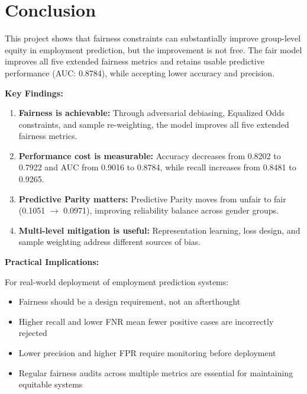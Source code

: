 \documentclass[11pt,a4paper]{article}
\begin{document}
\section{Conclusion}

This project shows that fairness constraints can substantially improve group-level equity in employment prediction, but the improvement is not free. The fair model improves all five extended fairness metrics and retains usable predictive performance (AUC: 0.8784), while accepting lower accuracy and precision.

\textbf{Key Findings:}

\begin{enumerate}
    \item \textbf{Fairness is achievable:} Through adversarial debiasing, Equalized Odds constraints, and sample re-weighting, the model improves all five extended fairness metrics.

    \item \textbf{Performance cost is measurable:} Accuracy decreases from 0.8202 to 0.7922 and AUC from 0.9016 to 0.8784, while recall increases from 0.8481 to 0.9265.

    \item \textbf{Predictive Parity matters:} Predictive Parity moves from unfair to fair (0.1051 $\rightarrow$ 0.0971), improving reliability balance across gender groups.

    \item \textbf{Multi-level mitigation is useful:} Representation learning, loss design, and sample weighting address different sources of bias.
\end{enumerate}

\textbf{Practical Implications:}

For real-world deployment of employment prediction systems:
\begin{itemize}
    \item Fairness should be a design requirement, not an afterthought
    \item Higher recall and lower FNR mean fewer positive cases are incorrectly rejected
    \item Lower precision and higher FPR require monitoring before deployment
    \item Regular fairness audits across multiple metrics are essential for maintaining equitable systems
\end{itemize}





%
\end{document}
